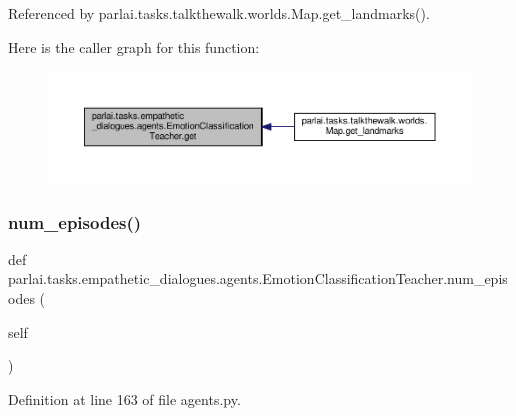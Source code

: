 Referenced by parlai.\+tasks.\+talkthewalk.\+worlds.\+Map.\+get\+\_\+landmarks().

Here is the caller graph for this function\+:
\nopagebreak
\begin{figure}[H]
\begin{center}
\leavevmode
\includegraphics[width=350pt]{classparlai_1_1tasks_1_1empathetic__dialogues_1_1agents_1_1EmotionClassificationTeacher_a21b3ea704923617e13db32c102f59841_icgraph}
\end{center}
\end{figure}
\mbox{\label{classparlai_1_1tasks_1_1empathetic__dialogues_1_1agents_1_1EmotionClassificationTeacher_acad8b18280f22798f1b0b6586e55765c}} 
\subsubsection{\texorpdfstring{num\+\_\+episodes()}{num\_episodes()}}
{\footnotesize\ttfamily def parlai.\+tasks.\+empathetic\+\_\+dialogues.\+agents.\+Emotion\+Classification\+Teacher.\+num\+\_\+episodes (\begin{DoxyParamCaption}\item[{}]{self }\end{DoxyParamCaption})}



Definition at line 163 of file agents.\+py.



